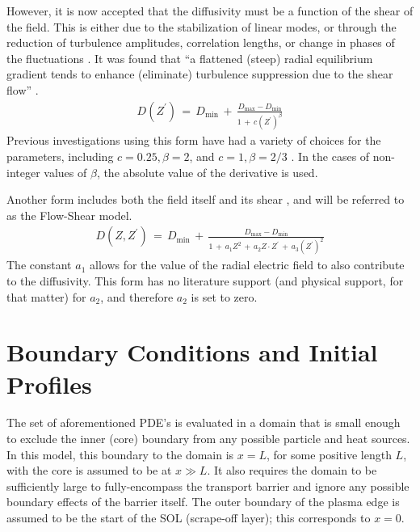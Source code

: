 However, it is now accepted that the diffusivity must be a function of the shear of the field.
This is either due to the stabilization of linear modes, or through the reduction of turbulence amplitudes, correlation lengths, or change in phases of the fluctuations \cite{connor_review_2000}.
It was found that ``a flattened (steep) radial equilibrium gradient tends to enhance (eliminate) turbulence suppression due to the shear flow'' \cite{zhang_edge_1992}.
\begin{align} %
	D(Z^{\prime}) \,=\, D_\text{min} \,+\, \frac{D_\text{max} - D_\text{min}}
		{1 \,+\, c(Z^{\prime})^{\beta}} \label{eq:shear_diffusivity}
\end{align}
Previous investigations using this form have had a variety of choices for the parameters, including $c = 0.25, \beta = 2$, and $c = 1, \beta = 2/3$ \cite{connor_review_2000} \cite{itoh_theoretical_1994}.
In the cases of non-integer values of $\beta$, the absolute value of the derivative is used.

Another form includes both the field itself and its shear \cite{paquay_studying_2012}, and will be referred to as the Flow-Shear model.
\begin{align} %
	D(Z, Z^{\prime}) \,=\, D_\text{min} \,+\,
		\frac{D_\text{max} - D_\text{min}}{1 \,+\, a_1 Z^2 \,+\,
		a_2 Z \cdot Z^{\prime} \,+\, a_3 (Z^{\prime})^2}
		\label{eq:flow_shear_diffusivity}
\end{align}
The constant $a_1$ allows for the value of the radial electric field to also contribute to the diffusivity.
This form has no literature support (and physical support, for that matter) for $a_2$, and therefore $a_2$ is set to zero.

\section{Boundary Conditions and Initial Profiles}\label{sec:boundary_conditions}
The set of aforementioned PDE's is evaluated in a domain that is small enough to exclude the inner (core) boundary from any possible particle and heat sources.
In this model, this boundary to the domain is $x = L$, for some positive length $L$, with the core is assumed to be at $x \gg L$.
It also requires the domain to be sufficiently large to fully-encompass the transport barrier and ignore any possible boundary effects of the barrier itself.
The outer boundary of the plasma edge is assumed to be the start of the SOL (scrape-off layer); this corresponds to $x = 0$.

